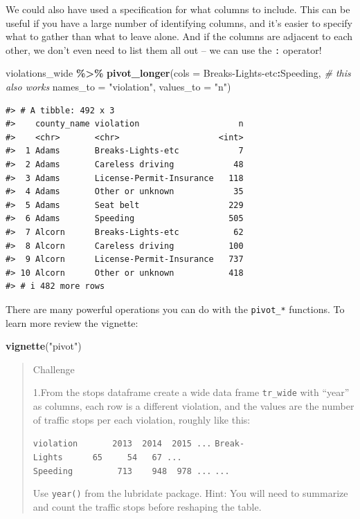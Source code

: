 \documentclass[
]{book}
\newenvironment{Shaded}{\begin{snugshade}}{\end{snugshade}}
\newcommand{\AttributeTok}[1]{\textcolor[rgb]{0.13,0.29,0.53}{#1}}
\newcommand{\CommentTok}[1]{\textcolor[rgb]{0.56,0.35,0.01}{\textit{#1}}}
\newcommand{\FunctionTok}[1]{\textcolor[rgb]{0.13,0.29,0.53}{\textbf{#1}}}
\newcommand{\NormalTok}[1]{#1}
\newcommand{\SpecialCharTok}[1]{\textcolor[rgb]{0.81,0.36,0.00}{\textbf{#1}}}
\newcommand{\StringTok}[1]{\textcolor[rgb]{0.31,0.60,0.02}{#1}}
\begin{document}
We could also have used a specification for what columns to include. This can be
useful if you have a large number of identifying columns, and it's easier to
specify what to gather than what to leave alone. And if the columns are adjacent to each other, we don't even need to list them all out -- we can use the \texttt{:} operator!

\begin{Shaded}
\begin{Highlighting}[]
\NormalTok{violations\_wide }\SpecialCharTok{\%\textgreater{}\%}
  \FunctionTok{pivot\_longer}\NormalTok{(}\AttributeTok{cols =} \StringTok{\textasciigrave{}}\AttributeTok{Breaks{-}Lights{-}etc}\StringTok{\textasciigrave{}}\SpecialCharTok{:}\NormalTok{Speeding,      }\CommentTok{\# this also works}
               \AttributeTok{names\_to =} \StringTok{"violation"}\NormalTok{, }
               \AttributeTok{values\_to =} \StringTok{"n"}\NormalTok{)}
\end{Highlighting}
\end{Shaded}

\begin{verbatim}
#> # A tibble: 492 x 3
#>    county_name violation                    n
#>    <chr>       <chr>                    <int>
#>  1 Adams       Breaks-Lights-etc            7
#>  2 Adams       Careless driving            48
#>  3 Adams       License-Permit-Insurance   118
#>  4 Adams       Other or unknown            35
#>  5 Adams       Seat belt                  229
#>  6 Adams       Speeding                   505
#>  7 Alcorn      Breaks-Lights-etc           62
#>  8 Alcorn      Careless driving           100
#>  9 Alcorn      License-Permit-Insurance   737
#> 10 Alcorn      Other or unknown           418
#> # i 482 more rows
\end{verbatim}

There are many powerful operations you can do with the \texttt{pivot\_*} functions. To learn more review the vignette:

\begin{Shaded}
\begin{Highlighting}[]
\FunctionTok{vignette}\NormalTok{(}\StringTok{"pivot"}\NormalTok{)}
\end{Highlighting}
\end{Shaded}

\begin{quote}
Challenge

1.From the stops dataframe create a wide data frame \texttt{tr\_wide} with
``year'' as columns, each row is a different violation,
and the values are the
number of traffic stops per each violation, roughly like this:

\texttt{violation\ \ \ \ \ \ \textbar{}\ 2013\ \textbar{}\ 2014\ \textbar{}\ 2015\ ...}
\texttt{Break-Lights\ \ \ \textbar{}\ \ \ 65\ \textbar{}\ \ \ \ 54\textbar{}\ \ \ 67\ ...}
\texttt{Speeding\ \ \ \ \ \ \ \textbar{}\ \ 713\ \textbar{}\ \ \ 948\textbar{}\ \ 978\ ...}
\texttt{...}

Use \texttt{year()} from the lubridate package. Hint: You will need to summarize
and count the traffic stops before reshaping the table.
\end{quote}
\end{document}
